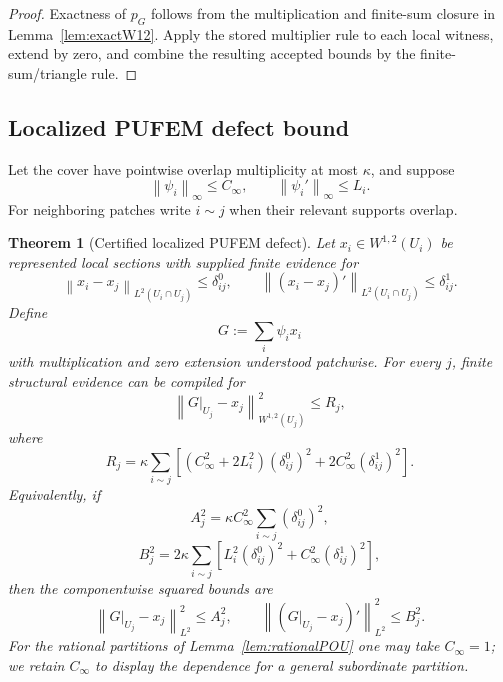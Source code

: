 \documentclass[11pt]{article}
\newtheorem{theorem}{Theorem}[section]
\theoremstyle{definition}
\newcommand{\norm}[1]{\left\lVert #1 \right\rVert}
\begin{document}
\begin{proof}
Exactness of $p_G$ follows from the multiplication and finite-sum closure in
Lemma~\ref{lem:exactW12}.  Apply the stored multiplier rule to each local witness, extend
by zero, and combine the resulting accepted bounds by the finite-sum/triangle rule.
\end{proof}

\subsection{Localized PUFEM defect bound}

Let the cover have pointwise overlap multiplicity at most $\kappa$, and suppose
\[
 \norm{\psi_i}_\infty\le C_\infty,
 \qquad
 \norm{\psi_i'}_\infty\le L_i.
\]
For neighboring patches write $i\sim j$ when their relevant supports overlap.

\begin{theorem}[Certified localized PUFEM defect]\label{thm:pufemdefect}
Let $x_i\in W^{1,2}(U_i)$ be represented local sections with supplied finite evidence for
\[
 \norm{x_i-x_j}_{L^2(U_i\cap U_j)}\le\delta^0_{ij},
 \qquad
 \norm{(x_i-x_j)'}_{L^2(U_i\cap U_j)}\le\delta^1_{ij}.
\]
Define
\[
 G:=\sum_i\psi_i x_i
\]
with multiplication and zero extension understood patchwise.  For every $j$, finite
structural evidence can be compiled for
\[
 \norm{G|_{U_j}-x_j}_{W^{1,2}(U_j)}^2\le R_j,
\]
where
\[
 R_j
 =\kappa\sum_{i\sim j}
 \left[(C_\infty^2+2L_i^2)(\delta^0_{ij})^2
       +2C_\infty^2(\delta^1_{ij})^2\right].
\]
Equivalently, if
\[
 A_j^2=\kappa C_\infty^2\sum_{i\sim j}(\delta^0_{ij})^2,
\]
\[
 B_j^2=2\kappa\sum_{i\sim j}
 \left[L_i^2(\delta^0_{ij})^2+C_\infty^2(\delta^1_{ij})^2\right],
\]
then the componentwise squared bounds are
\[
 \norm{G|_{U_j}-x_j}_{L^2}^2\le A_j^2,
 \qquad
 \norm{(G|_{U_j}-x_j)'}_{L^2}^2\le B_j^2.
\]
For the rational partitions of Lemma~\ref{lem:rationalPOU} one may take $C_\infty=1$;
we retain $C_\infty$ to display the dependence for a general subordinate partition.
\end{theorem}
\end{document}
